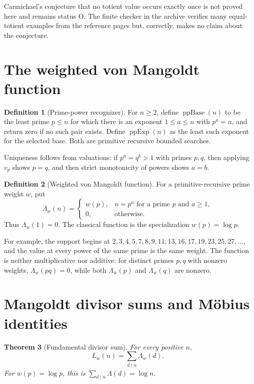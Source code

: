 \documentclass[11pt]{article}
\newtheorem{theorem}{Theorem}[section]
\theoremstyle{definition}
\newtheorem{definition}[theorem]{Definition}
\newcommand{\StatusO}{\textsf{O}}
\begin{document}
Carmichael's conjecture that no totient value occurs exactly once is not proved
here and remains status \StatusO.  The finite checker in the archive verifies
many equal-totient examples from the reference pages but, correctly, makes no
claim about the conjecture.

\section{The weighted von Mangoldt function}

\begin{definition}[Prime-power recognizer]\label{def:primepow}
For \(n\ge2\), define \(\operatorname{ppBase}(n)\) to be the least prime
\(p\le n\) for which there is an exponent \(1\le a\le n\) with \(p^a=n\),
and return zero if no such pair exists.  Define
\(\operatorname{ppExp}(n)\) as the least such exponent for the selected base.
Both are primitive recursive bounded searches.
\end{definition}

Uniqueness follows from valuations: if \(p^a=q^b>1\) with primes \(p,q\),
then applying \(v_p\) shows \(p=q\), and then strict monotonicity of powers
shows \(a=b\).

\begin{definition}[Weighted von Mangoldt function]\label{def:weighted-lambda}
For a primitive-recursive prime weight \(w\), put
\[
 \Lambda_w(n)=\begin{cases}
 w(p),&n=p^a\text{ for a prime }p\text{ and }a\ge1,\\
 0,&\text{otherwise}.
 \end{cases}
\]
Thus \(\Lambda_w(1)=0\).  The classical function is the specialization
\(w(p)=\log p\).
\end{definition}

For example, the support begins at
\(2,3,4,5,7,8,9,11,13,16,17,19,23,25,27,\ldots\), and the value at every
power of the same prime is the same weight.  The function is neither
multiplicative nor additive: for distinct primes \(p,q\) with nonzero weights,
\(\Lambda_w(pq)=0\), while both \(\Lambda_w(p)\) and
\(\Lambda_w(q)\) are nonzero.

\section{Mangoldt divisor sums and M\"obius identities}

\begin{theorem}[Fundamental divisor sum]\label{thm:lambda-divsum}
For every positive \(n\),
\[
 \boxed{\displaystyle
 L_w(n)=\sum_{d\mid n}\Lambda_w(d).}
\]
For \(w(p)=\log p\), this is
\(\sum_{d\mid n}\Lambda(d)=\log n\).
\end{theorem}
\end{document}

